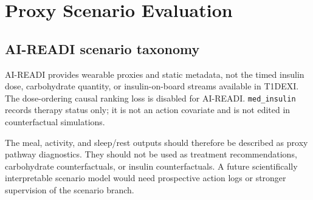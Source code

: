 \section{Proxy Scenario Evaluation}
\label{sec:proxy}

\subsection{AI-READI scenario taxonomy}
AI-READI provides wearable proxies and static metadata, not the timed insulin dose, carbohydrate quantity, or insulin-on-board streams available in T1DEXI. The dose-ordering causal ranking loss is disabled for AI-READI. \texttt{med\_insulin} records therapy status only; it is not an action covariate and is not edited in counterfactual simulations.

\GeneratedScenarioInterpretation

\GeneratedScenarioTables

\GeneratedScenarioFigures

The meal, activity, and sleep/rest outputs should therefore be described as proxy pathway diagnostics. They should not be used as treatment recommendations, carbohydrate counterfactuals, or insulin counterfactuals. A future scientifically interpretable scenario model would need prospective action logs or stronger supervision of the scenario branch.
